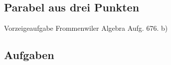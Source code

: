 \subsection{Parabel aus drei Punkten}
Vorzeigeaufgabe Frommenwiler Algebra Aufg. 676. b)


\subsection*{Aufgaben}


\newpage


